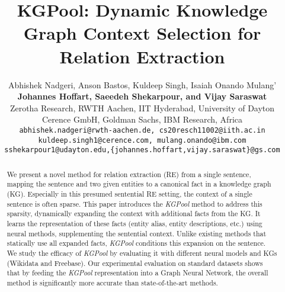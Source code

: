 \documentclass[11pt,a4paper]{article}
\title{KGPool: Dynamic Knowledge Graph Context Selection for Relation Extraction}
\author{Abhishek Nadgeri, Anson Bastos, Kuldeep Singh, Isaiah Onando Mulang' \\
\textbf{Johannes Hoffart, Saeedeh Shekarpour, and Vijay Saraswat} \\
Zerotha Research, 
RWTH Aachen, 
IIT Hyderabad,
University of Dayton\\
Cerence GmbH, 
Goldman Sachs,
IBM Research, Africa\\
{\tt abhishek.nadgeri@rwth-aachen.de, cs20resch11002@iith.ac.in} \\
{\tt kuldeep.singh1@cerence.com, mulang.onando@ibm.com} \\
{\tt sshekarpour1@udayton.edu,\{johannes.hoffart,vijay.saraswat\}@gs.com}
  }
\date{}
\begin{document}
\setlength{\abovedisplayskip}{3pt}
\setlength{\belowdisplayskip}{3pt}

\maketitle


\begin{abstract}
We present a novel method for relation extraction (RE) from a single sentence, mapping the sentence and two given entities to a canonical fact in a knowledge graph (KG). Especially in this presumed sentential RE setting, the context of a single sentence is often sparse. This paper introduces the \emph{KGPool} method to address this sparsity, dynamically expanding the context with additional facts from the KG. It learns the representation of these facts (entity alias, entity descriptions, etc.) using neural methods, supplementing the sentential context. Unlike existing methods that statically use all expanded facts, \emph{KGPool} conditions this expansion on the sentence. We study the efficacy of \emph{KGPool} by evaluating it with different neural models and KGs (Wikidata and Freebase). Our experimental evaluation on standard datasets shows that by feeding the \emph{KGPool} representation into a Graph Neural Network, the overall method is significantly more accurate than state-of-the-art methods. 
\end{abstract}
\end{document}
